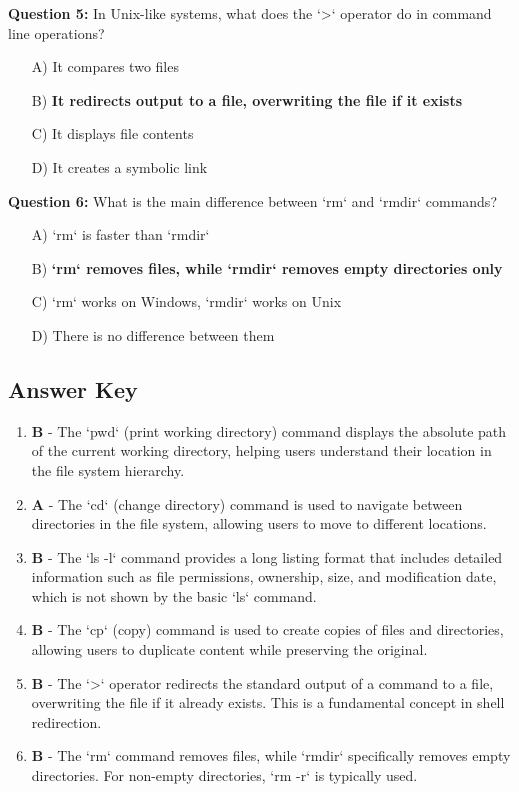 \textbf{Question 5:} In Unix-like systems, what does the `>` operator do in command line operations?

\begin{enumerate}
    \item[A)] It compares two files
    \item[B)] \textbf{It redirects output to a file, overwriting the file if it exists}
    \item[C)] It displays file contents
    \item[D)] It creates a symbolic link
\end{enumerate}

\textbf{Question 6:} What is the main difference between `rm` and `rmdir` commands?

\begin{enumerate}
    \item[A)] `rm` is faster than `rmdir`
    \item[B)] \textbf{`rm` removes files, while `rmdir` removes empty directories only}
    \item[C)] `rm` works on Windows, `rmdir` works on Unix
    \item[D)] There is no difference between them
\end{enumerate}

\subsection{Answer Key}

\begin{enumerate}
    \item \textbf{B} - The `pwd` (print working directory) command displays the absolute path of the current working directory, helping users understand their location in the file system hierarchy.
    
    \item \textbf{A} - The `cd` (change directory) command is used to navigate between directories in the file system, allowing users to move to different locations.
    
    \item \textbf{B} - The `ls -l` command provides a long listing format that includes detailed information such as file permissions, ownership, size, and modification date, which is not shown by the basic `ls` command.
    
    \item \textbf{B} - The `cp` (copy) command is used to create copies of files and directories, allowing users to duplicate content while preserving the original.
    
    \item \textbf{B} - The `>` operator redirects the standard output of a command to a file, overwriting the file if it already exists. This is a fundamental concept in shell redirection.
    
    \item \textbf{B} - The `rm` command removes files, while `rmdir` specifically removes empty directories. For non-empty directories, `rm -r` is typically used.
\end{enumerate}

